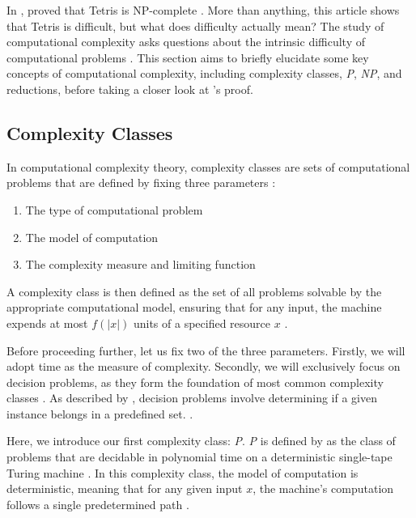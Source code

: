 \documentclass[a4paper, 12pt]{extreport}
\begin{document}
			In \citeyear{tetris-is-hard-even-to-approx}, \citeauthor{tetris-is-hard-even-to-approx} proved that Tetris is NP-complete \cite{tetris-is-hard-even-to-approx}. More than anything, this article shows that Tetris is difficult, but what does difficulty actually mean? The study of computational complexity asks questions about the intrinsic difficulty of computational problems \cite{cc:conceptual-perspective}. This section aims to briefly elucidate some key concepts of computational complexity, including complexity classes, \textit{P}, \textit{NP}, and reductions, before taking a closer look at \citeauthor{tetris-is-hard-even-to-approx}'s proof.
			
			\subsection{Complexity Classes}\label{subsec:compclass}
				
				In computational complexity theory, complexity classes are sets of computational problems that are defined by fixing three parameters \cite{cc:conceptual-perspective}:
				\begin{enumerate}
					\item The type of computational problem
					\item The model of computation
					\item The complexity measure and limiting function
				\end{enumerate}
				
				A complexity class is then defined as the set of all problems solvable by the appropriate computational model, ensuring that for any input, the machine expends at most $f(|x|)$ units of a specified resource $x$ \cite{comp-complexity-papa}.
				
				Before proceeding further, let us fix two of the three parameters. Firstly, we will adopt time as the measure of complexity. Secondly, we will exclusively focus on decision problems, as they form the foundation of most common complexity classes \cite{goldreich-p-np-np-comp}.	As described by \citeauthor{goldreich-p-np-np-comp}, decision problems involve determining if a given instance belongs in a predefined set. \cite{goldreich-p-np-np-comp}.
				
				Here, we introduce our first complexity class: \textit{P}. \textit{P} is defined by \citeauthor{sipser-intro-to-computation} as the class of problems that are decidable in polynomial time on a deterministic single-tape Turing machine \cite{sipser-intro-to-computation}. In this complexity class, the model of computation is deterministic, meaning that for any given input $x$, the machine's computation follows a single predetermined path \cite{sipser-intro-to-computation}.
				
\end{document}
